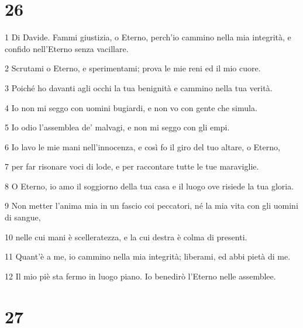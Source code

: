 \chapter{26}

\par 1 Di Davide. Fammi giustizia, o Eterno, perch'io cammino nella mia integrità, e confido nell'Eterno senza vacillare.
\par 2 Scrutami o Eterno, e sperimentami; prova le mie reni ed il mio cuore.
\par 3 Poiché ho davanti agli occhi la tua benignità e cammino nella tua verità.
\par 4 Io non mi seggo con uomini bugiardi, e non vo con gente che simula.
\par 5 Io odio l'assemblea de' malvagi, e non mi seggo con gli empi.
\par 6 Io lavo le mie mani nell'innocenza, e così fo il giro del tuo altare, o Eterno,
\par 7 per far risonare voci di lode, e per raccontare tutte le tue maraviglie.
\par 8 O Eterno, io amo il soggiorno della tua casa e il luogo ove risiede la tua gloria.
\par 9 Non metter l'anima mia in un fascio coi peccatori, né la mia vita con gli uomini di sangue,
\par 10 nelle cui mani è scelleratezza, e la cui destra è colma di presenti.
\par 11 Quant'è a me, io cammino nella mia integrità; liberami, ed abbi pietà di me.
\par 12 Il mio piè sta fermo in luogo piano. Io benedirò l'Eterno nelle assemblee.

\chapter{27}

